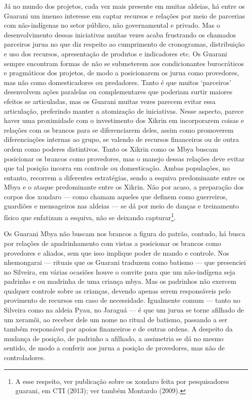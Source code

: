 Já no mundo dos projetos, cada vez mais presente em muitas aldeias, há
entre os Guarani um imenso interesse em captar recursos e relações por
meio de parcerias com não-indígenas no setor público, não governamental
e privado. Mas o desenvolvimento dessas iniciativas muitas vezes acaba
frustrando os chamados parceiros jurua no que diz respeito ao
cumprimento de cronogramas, distribuição e uso dos recursos,
apresentação de produtos e indicadores etc. Os Guarani sempre encontram
formas de não se submeterem aos condicionantes burocráticos e
pragmáticos dos projetos, de modo a posicionarem os jurua como
provedores, mas não como domesticadores ou predadores. Tanto é que
muitos ‘parceiros’ desenvolvem ações paralelas ou complementares que
poderiam surtir maiores efeitos se articuladas, mas os Guarani muitas
vezes parecem evitar essa articulação, preferindo manter a atomização
de iniciativas. Nesse aspecto, parece haver uma proximidade com o
investimento dos Xikrin em incorporarem coisas e relações com os
brancos para se diferenciarem deles, assim como promoverem
diferenciações internas ao grupo, se valendo de recursos financeiros ou
de outra ordem como poderes distintivos. Tanto os Xikrin como os Mbya
buscam posicionar os brancos como provedores, mas o manejo dessas
relações deve evitar que tal posição incorra em controle ou
domesticação. Ambas populações, no entanto, recorrem a diferentes
estratégias, sendo a esquiva predominante entre os Mbya e o ataque
predominante entre os Xikrin. Não por acaso, a preparação dos corpos
dos xondaro — como chamam aqueles que definem como guerreiros,
guardiões e mensageiros nas aldeias — se dá por meio de danças e
treinamento físico que enfatizam a esquiva, não se deixando
capturar\footnote{A esse respeito, ver publicação sobre os xondaro
feita por pesquisadores guarani, em CTI (2013); ver também Montardo
(2009).}.

Os Guarani Mbya não buscam nos brancos a figura do patrão, contudo, há
busca por relações de apadrinhamento com vistas a posicionar os brancos
como provedores e aliados, sem que isso implique poder de mando e
controle. Nos nhemongarai — rituais que os Guarani traduzem como
batismo — que presenciei no Silveira, em várias ocasiões houve o
convite para que um não-indígena seja padrinho e ou madrinha de uma
criança mbya. Mas os padrinhos não exercem qualquer controle sobre as
crianças, devendo apenas serem responsáveis pelo provimento de recursos
em caso de necessidade. Igualmente comum — tanto no Silveira como na
aldeia Pyau, no Jaraguá — é que um jurua se torne afilhado de um
xeramõi, ao receber dele um nome no ritual de batismo, passando a ser
também responsável por apoios financeiros e de outras ordens. A
despeito da mudança de posição, de padrinho a afilhado, a assimetria se
dá no mesmo sentido, de modo a conferir aos jurua a posição de
provedores, mas não de controladores.

